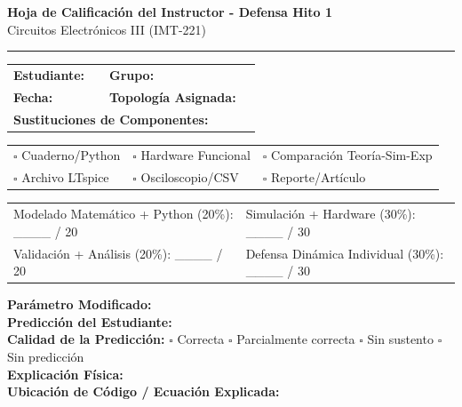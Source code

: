 \documentclass[11pt, a4paper]{article}
\begin{document}
\begin{center}
    {\Large \textbf{Hoja de Calificación del Instructor - Defensa Hito 1}}\\[0.2cm]
    {\large Circuitos Electrónicos III (IMT-221)}
\end{center}
\hrule
\vspace{0.3cm}

\begin{tcolorbox}[colback=white, colframe=black, title=\textbf{1. Identificación}]
\begin{tabularx}{\textwidth}{lXlX}
\textbf{Estudiante:} & \hrulefill & \textbf{Grupo:} & \hrulefill \\
\textbf{Fecha:} & \hrulefill & \textbf{Topología Asignada:} & \hrulefill \\
\multicolumn{4}{l}{\textbf{Sustituciones de Componentes:} \hrulefill} \\
\end{tabularx}
\end{tcolorbox}

\begin{tcolorbox}[colback=white, colframe=black, title=\textbf{2. Disponibilidad de Evidencia}]
\begin{tabularx}{\textwidth}{XXX}
$\square$ Cuaderno/Python & $\square$ Hardware Funcional & $\square$ Comparación Teoría-Sim-Exp \\
$\square$ Archivo LTspice & $\square$ Osciloscopio/CSV & $\square$ Reporte/Artículo \\
\end{tabularx}
\end{tcolorbox}

\begin{tcolorbox}[colback=white, colframe=black, title=\textbf{3. Dimensiones de la Rúbrica (Puntaje Oficial)}]
\begin{tabularx}{\textwidth}{X X}
Modelado Matemático + Python (20\%): \_\_\_\_ / 20 & Simulación + Hardware (30\%): \_\_\_\_ / 30 \\
Validación + Análisis (20\%): \_\_\_\_ / 20 & Defensa Dinámica Individual (30\%): \_\_\_\_ / 30 \\
\end{tabularx}
\end{tcolorbox}

\begin{tcolorbox}[colback=blue!5, colframe=blue!75!black, title=\textbf{4. Prueba de Parámetro en Vivo (Live Prompt)}]
\textbf{Parámetro Modificado:} \hrulefill \\[0.2cm]
\textbf{Predicción del Estudiante:} \hrulefill \\[0.2cm]
\textbf{Calidad de la Predicción:} $\square$ Correcta \hspace{0.2cm} $\square$ Parcialmente correcta \hspace{0.2cm} $\square$ Sin sustento \hspace{0.2cm} $\square$ Sin predicción \\[0.2cm]
\textbf{Explicación Física:} \hrulefill \\[0.2cm]
\textbf{Ubicación de Código / Ecuación Explicada:} \hrulefill 
\end{tcolorbox}
\end{document}
